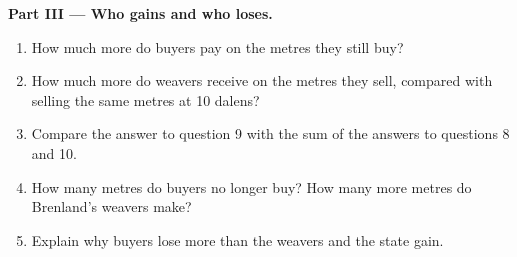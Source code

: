 \begin{problem}
\medskip
\noindent\textbf{Part III --- Who gains and who loses.}
\begin{enumerate}[resume]
  \item How much more do buyers pay on the metres they still buy?
  \item How much more do weavers receive on the metres they sell, compared with selling the same metres
        at 10 dalens?
  \item Compare the answer to question 9 with the sum of the answers to questions 8 and 10.
  \item How many metres do buyers no longer buy? How many more metres do Brenland's weavers make?
  \item Explain why buyers lose more than the weavers and the state gain.
\end{enumerate}
\end{problem}
